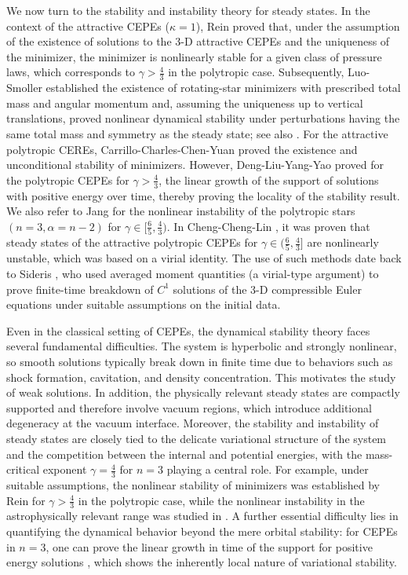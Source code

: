 \documentclass[reqno,11pt]{amsart}
\numberwithin{equation}{section}
\theoremstyle{definition}
\begin{document}
We now turn to the stability and instability theory for steady states. In the context of the attractive CEPEs {\rm (}$\kappa = 1${\rm )}, Rein \cite{Rein_2003} proved that, 
under the assumption of the existence of solutions to the 3-D attractive CEPEs and the uniqueness of the minimizer, 
the minimizer is nonlinearly stable for a given class of pressure laws, which corresponds to 
$\gamma > \frac{4}{3}$ in the polytropic case. Subsequently, Luo-Smoller 
\cite{LuoSmoller2009} established the existence of rotating-star minimizers with prescribed 
total mass and angular momentum and, assuming the uniqueness up to vertical translations, proved nonlinear dynamical stability under perturbations having the same total mass and symmetry 
as the steady state; see also  \cite{Luo_2008,LinWangZhu2025}. For the attractive polytropic CEREs, Carrillo-Charles-Chen-Yuan \cite{Carrillo2025} proved 
the existence and unconditional stability of minimizers. However, Deng-Liu-Yang-Yao \cite{Deng_2002} proved for the polytropic CEPEs for $\gamma > \frac{4}{3}$, the linear 
growth of the support of solutions with positive energy over time, thereby proving 
the locality of the stability result.  We also refer to Jang \cite{Jang2008,Jang2014} for the nonlinear instability 
of the polytropic stars $(n=3,\alpha=n-2)$ for $\gamma\in[\frac{6}{5},\frac{4}{3})$. In Cheng-Cheng-Lin \cite{Cheng_2025}, it was proven that steady states of the attractive 
polytropic CEPEs for $\gamma\in(\frac{6}{5},\frac{4}{3}]$ are nonlinearly unstable, 
which was based on a virial identity. The use of such methods date back to Sideris \cite{Sideris_1985}, who used
averaged moment quantities (a virial-type
argument) to prove finite-time breakdown of $C^1$ solutions of the
3-D compressible Euler equations under suitable
assumptions on the initial data.

\smallskip
Even in the classical setting of CEPEs, the dynamical stability theory faces several fundamental difficulties. 
The system is hyperbolic and strongly nonlinear, so smooth solutions typically break down in finite time 
due to behaviors such as shock formation, cavitation, and density concentration.
This motivates the study of weak solutions. 
In addition, the physically relevant steady states are compactly supported and therefore 
involve vacuum regions, which introduce additional degeneracy at the vacuum interface. 
Moreover, the stability and instability of steady states are closely tied to the delicate 
variational structure of the system and 
the competition between the internal and potential energies, 
with the mass-critical exponent $\gamma=\frac{4}{3}$ for $n=3$ playing a central role. 
For example, under suitable assumptions, the nonlinear stability of minimizers 
was established by Rein \cite{Rein_2003} for $\gamma>\frac{4}{3}$ in the polytropic case, 
while the nonlinear instability in the astrophysically relevant range was studied in \cite{Jang2008,Jang2014,Cheng_2025}. 
A further essential difficulty lies in quantifying the dynamical behavior beyond the mere orbital stability: 
for CEPEs in $n=3$, one can prove the linear growth in time of the support for positive energy solutions \cite{Deng_2002}, which shows the inherently local nature of variational stability.
 
\end{document}
